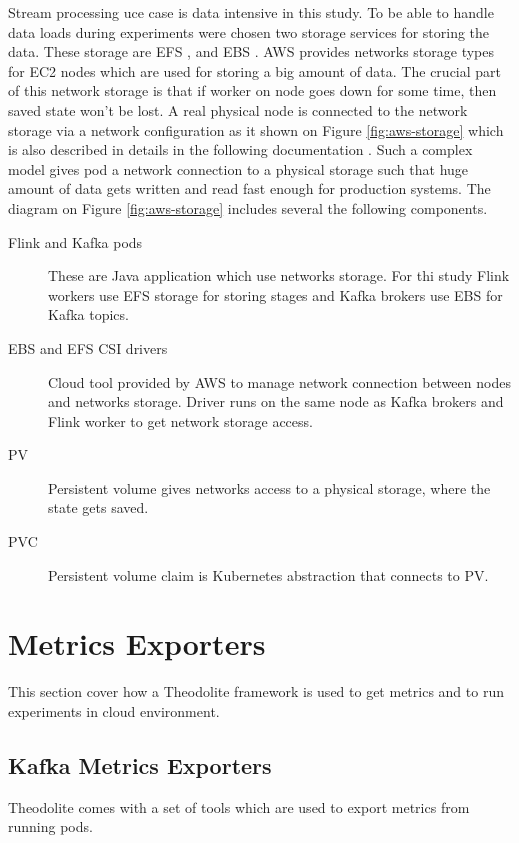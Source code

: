 Stream processing uce case is data intensive in this study.
To be able to handle data loads during experiments were chosen two storage services
for storing the data.
These storage are EFS \cite{awsEFS}, and EBS \cite{awsEBS}.
AWS provides networks storage types for EC2 nodes \cite{EC2} which are used
for storing a big amount of data.
The crucial part of this network storage is that if worker on node goes down for some time,
then saved state won't be lost.
A real physical node is connected to the network storage via a network configuration as it shown on Figure \ref{fig:aws-storage}
which is also described in details in the following documentation \cite{awsKubernetesStorage}.
Such a complex model gives pod a network connection to a physical storage such that huge amount
of data gets written and read fast enough for production systems.
The diagram on Figure \ref{fig:aws-storage} includes several the following components.

\begin{description}
    \item[Flink and Kafka pods] These are Java application which use networks storage.
    For thi study Flink workers use EFS storage for storing stages and Kafka brokers
    use EBS for Kafka topics.
    \item[EBS and EFS CSI drivers] Cloud tool provided by AWS to manage network connection
    between nodes and networks storage.
    Driver runs on the same node as Kafka brokers and Flink worker to get network storage access.
    \item[PV] Persistent volume gives networks access to a physical storage, where the state gets saved.
    \item[PVC] Persistent volume claim is Kubernetes abstraction that connects to PV.
\end{description}


\section{Metrics Exporters}\label{sec:metrics-exporters}
This section cover how a Theodolite framework \cite{theodolite_framework} is used
to get metrics and to run experiments in cloud environment.

\subsection{Kafka Metrics Exporters}\label{subsec:metrics-exporters}
Theodolite comes with a set of tools which are used to export metrics from running pods.

